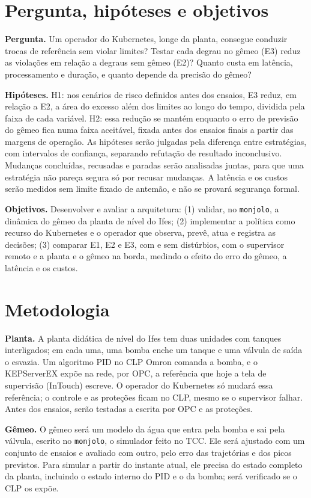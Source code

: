 \documentclass[11pt,a4paper]{article}
\begin{document}
\section{Pergunta, hipóteses e objetivos}

\textbf{Pergunta.} Um operador do Kubernetes, longe da planta, consegue conduzir trocas de referência sem violar limites? Testar cada degrau no gêmeo (E3) reduz as violações em relação a degraus sem gêmeo (E2)? Quanto custa em latência, processamento e duração, e quanto depende da precisão do gêmeo?

\textbf{Hipóteses.} H1: nos cenários de risco definidos antes dos ensaios, E3 reduz, em relação a E2, a área do excesso além dos limites ao longo do tempo, dividida pela faixa de cada variável. H2: essa redução se mantém enquanto o erro de previsão do gêmeo fica numa faixa aceitável, fixada antes dos ensaios finais a partir das margens de operação. As hipóteses serão julgadas pela diferença entre estratégias, com intervalos de confiança, separando refutação de resultado inconclusivo. Mudanças concluídas, recusadas e paradas serão analisadas juntas, para que uma estratégia não pareça segura só por recusar mudanças. A latência e os custos serão medidos sem limite fixado de antemão, e não se provará segurança formal.

\textbf{Objetivos.} Desenvolver e avaliar a arquitetura: (1) validar, no \texttt{monjolo}, a dinâmica do gêmeo da planta de nível do Ifes; (2) implementar a política como recurso do Kubernetes e o operador que observa, prevê, atua e registra as decisões; (3) comparar E1, E2 e E3, com e sem distúrbios, com o supervisor remoto e a planta e o gêmeo na borda, medindo o efeito do erro do gêmeo, a latência e os custos.

\section{Metodologia}

\textbf{Planta.} A planta didática de nível do Ifes tem duas unidades com tanques interligados; em cada uma, uma bomba enche um tanque e uma válvula de saída o esvazia. Um algoritmo PID no CLP Omron comanda a bomba, e o KEPServerEX expõe na rede, por OPC, a referência que hoje a tela de supervisão (InTouch) escreve. O operador do Kubernetes só mudará essa referência; o controle e as proteções ficam no CLP, mesmo se o supervisor falhar. Antes dos ensaios, serão testadas a escrita por OPC e as proteções.

\textbf{Gêmeo.} O gêmeo será um modelo da água que entra pela bomba e sai pela válvula, escrito no \texttt{monjolo}, o simulador feito no TCC. Ele será ajustado com um conjunto de ensaios e avaliado com outro, pelo erro das trajetórias e dos picos previstos. Para simular a partir do instante atual, ele precisa do estado completo da planta, incluindo o estado interno do PID e o da bomba; será verificado se o CLP os expõe.
\end{document}

